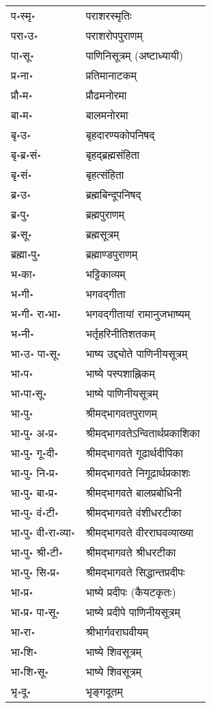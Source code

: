 \begin{longtable}{ll}
प॰स्मृ॰ & पराशरस्मृतिः\\
परा॰उ॰ & पराशरोपपुराणम्\\
पा॰सू॰ & पाणिनिसूत्रम् (अष्टाध्यायी)\\
प्र॰ना॰ & प्रतिमानाटकम्\\
प्रौ॰म॰ & प्रौढमनोरमा\\
बा॰म॰ & बालमनोरमा\\
बृ॰उ॰ & बृहदारण्यकोपनिषद्\\
बृ॰ब्र॰सं॰ & बृहद्ब्रह्मसंहिता\\
बृ॰सं॰ & बृहत्संहिता\\
ब्र॰उ॰ & ब्रह्मबिन्दूपनिषद्\\
ब्र॰पु॰ & ब्रह्मपुराणम्\\
ब्र॰सू॰ & ब्रह्मसूत्रम्\\
ब्रह्मा॰पु॰ & ब्रह्माण्डपुराणम्\\
भ॰का॰ & भट्टिकाव्यम्\\
भ॰गी॰ & भगवद्गीता\\
भ॰गी॰ रा॰भा॰ & भगवद्गीतायां रामानुजभाष्यम्\\
भ॰नी॰ & भर्तृहरिनीतिशतकम्\\
भा॰उ॰ पा॰सू॰ & भाष्य उद्द्योते पाणिनीयसूत्रम्\\
भा॰प॰ & भाष्ये पस्पशाह्निकम्\\
भा॰पा॰सू॰ & भाष्ये पाणिनीयसूत्रम्\\
भा॰पु॰ & श्रीमद्भागवतपुराणम्\\
भा॰पु॰ अ॰प्र॰ & श्रीमद्भागवतेऽन्वितार्थप्रकाशिका\\
भा॰पु॰ गू॰दी॰ & श्रीमद्भागवते गूढार्थदीपिका\\
भा॰पु॰ नि॰प्र॰ & श्रीमद्भागवते निगूढार्थप्रकाशः\\
भा॰पु॰ बा॰प्र॰ & श्रीमद्भागवते बालप्रबोधिनी\\
भा॰पु॰ वं॰टी॰ & श्रीमद्भागवते वंशीधरटीका\\
भा॰पु॰ वी॰रा॰व्या॰ & श्रीमद्भागवते वीरराघवव्याख्या\\
भा॰पु॰ श्री॰टी॰ & श्रीमद्भागवते श्रीधरटीका\\
भा॰पु॰ सि॰प्र॰ & श्रीमद्भागवते सिद्धान्तप्रदीपः\\
भा॰प्र॰ & भाष्ये प्रदीपः (कैयटकृतः)\\
भा॰प्र॰ पा॰सू॰ & भाष्ये प्रदीपे पाणिनीयसूत्रम्\\
भा॰रा॰ & श्रीभार्गवराघवीयम्\\
भा॰शि॰ & भाष्ये शिवसूत्रम्\\
भा॰शि॰सू॰ & भाष्ये शिवसूत्रम्\\
भृ॰दू॰ & भृङ्गदूतम्\\

\end{longtable}
